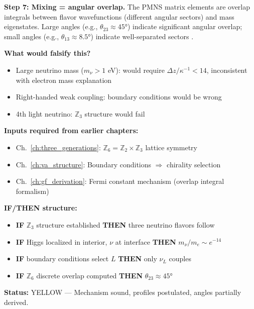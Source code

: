 \begin{tcolorbox}[colback=green!5!white, colframe=green!50!black,
    title=\textbf{Physical Process Narrative: How Neutrinos Become ``Ghostly''}]
\textbf{Step 7: Mixing = angular overlap.}
The PMNS matrix elements are overlap integrals between flavor wavefunctions (different
angular sectors) and mass eigenstates. Large angles (e.g., $\theta_{23} \approx 45°$)
indicate significant angular overlap; small angles (e.g., $\theta_{13} \approx 8.5°$)
indicate well-separated sectors \tagP{}.

\textbf{What would falsify this?}
\begin{itemize}[nosep]
    \item Large neutrino mass ($m_\nu > 1$ eV): would require $\Delta z/\kappa^{-1} < 14$,
          inconsistent with electron mass explanation
    \item Right-handed weak coupling: boundary conditions would be wrong
    \item 4th light neutrino: $\mathbb{Z}_3$ structure would fail
\end{itemize}
\end{tcolorbox}


\begin{tcolorbox}[colback=blue!5!white, colframe=blue!50!black,
    title=\textbf{Dependency \& Status}]
\textbf{Inputs required from earlier chapters:}
\begin{itemize}[nosep]
    \item Ch.~\ref{ch:three_generations}: $\mathbb{Z}_6 = \mathbb{Z}_2 \times \mathbb{Z}_3$ lattice symmetry
    \item Ch.~\ref{ch:va_structure}: Boundary conditions $\Rightarrow$ chirality selection
    \item Ch.~\ref{ch:gf_derivation}: Fermi constant mechanism (overlap integral formalism)
\end{itemize}

\textbf{IF/THEN structure:}
\begin{itemize}[nosep]
    \item \textbf{IF} $\mathbb{Z}_3$ structure established \textbf{THEN} three neutrino flavors follow \tagI{}
    \item \textbf{IF} Higgs localized in interior, $\nu$ at interface \textbf{THEN} $m_\nu/m_e \sim e^{-14}$ \tagDc{}
    \item \textbf{IF} boundary conditions select $L$ \textbf{THEN} only $\nu_L$ couples \tagDc{}
    \item \textbf{IF} $\mathbb{Z}_6$ discrete overlap computed \textbf{THEN} $\theta_{23} \approx 45°$ \tagDc{}
\end{itemize}

\textbf{Status:} YELLOW --- Mechanism sound, profiles postulated, angles partially derived.
\end{tcolorbox}

